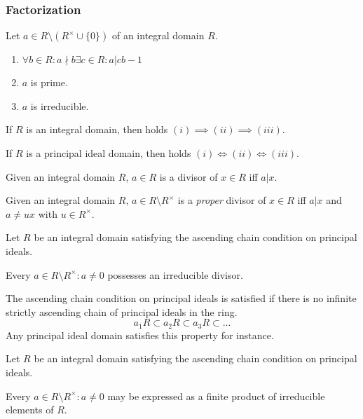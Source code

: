 \subsubsection{Factorization}
\begin{proposition}
   Let \(a \in R \setminus (R^\times \cup \{0\})\) of an integral domain \(R\).
   \begin{enumerate}[label=\roman*, align=Center]
      \item \(\forall b \in R: a\nmid b \exists c \in R: a | cb -1\)
      \item \(a\) is prime.
      \item \(a\) is irreducible.
   \end{enumerate}

   If \(R\) is an integral domain, then holds \((i) \implies (ii) \implies (iii)\).

   If \(R\) is a principal ideal domain, then holds \((i) \iff (ii) \iff (iii)\).
\end{proposition}

\begin{definition}[Divisor]
   Given an integral domain \(R\), \(a \in R\) is a divisor of \(x \in R\) iff \(a | x\).
\end{definition}

\begin{definition}
   Given an integral domain \(R\), \(a \in R \setminus R^\times\) is a \emph{proper} divisor of \(x \in R\) iff \(a | x\) and \(a \neq ux\) with \(u \in R^\times\).
\end{definition}

\begin{lemma}
   Let \(R\) be an integral domain satisfying the ascending chain condition on principal ideals.

   Every \(a \in R \setminus R^\times: a \neq 0\) possesses an irreducible divisor.
\end{lemma}
\begin{remark}
   The ascending chain condition on principal ideals is satisfied if there is no infinite strictly ascending chain of principal ideals in the ring.
   \[a_1R \subset a_2R \subset a_3R \subset \ldots\]
   Any principal ideal domain satisfies this property for instance.
\end{remark}

\begin{proposition}
   Let \(R\) be an integral domain satisfying the ascending chain condition on principal ideals.

   Every \(a \in R \setminus R^\times: a \neq 0\) may be expressed as a finite product of irreducible elements of \(R\).
\end{proposition}

